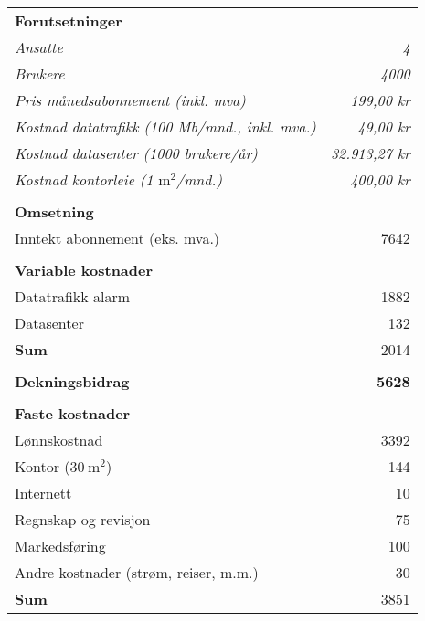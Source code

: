 \begin{table}
  \centering
  \begin{tabular}{lr}
    \textbf{Forutsetninger} & \\
    \textit{Ansatte}                                           & \textit{4} \\
    \textit{Brukere}                                           & \textit{4000} \\
    \textit{Pris månedsabonnement (inkl. mva)}            & \textit{199,00 kr} \\
    \textit{Kostnad datatrafikk (100 Mb/mnd., inkl. mva.)}   & \textit{49,00 kr} \\
    \textit{Kostnad datasenter (1000 brukere/år)}            & \textit{32.913,27 kr} \\
    \textit{Kostnad kontorleie (1 $\text{m}^2$/mnd.)}        & \textit{400,00 kr} \\
    \\
    \textbf{Omsetning} & \\
    Inntekt abonnement (eks. mva.)                    &  7642 \\
    \\
    \textbf{Variable kostnader} & \\
    Datatrafikk alarm                                 &  1882 \\
    Datasenter                                        &   132 \\
    \textbf{Sum}                                      &  2014 \\
    \\
    \textbf{Dekningsbidrag}                           &  \textbf{5628} \\
    \hline
    \\
    \textbf{Faste kostnader}                       & \\
    Lønnskostnad                                      &  3392 \\
    Kontor             ($30~\text{m}^2$)              &   144 \\
    Internett                                         &    10 \\
    Regnskap og revisjon                              &    75 \\
    Markedsføring                                     &   100 \\
    Andre kostnader (strøm, reiser, m.m.)             &    30 \\
    \textbf{Sum}                                      &  3851 \\

\end{tabular}
\end{table}
